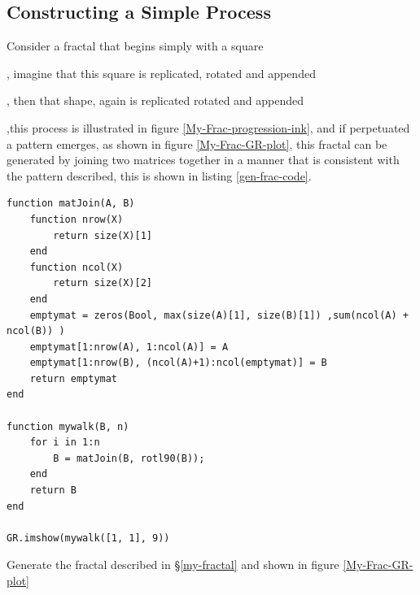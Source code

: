 \documentclass[a4paper,11pt,twoside]{article}
\begin{document}
\subsection{Constructing a Simple Process}
\label{sec:org4777473}

Consider a fractal that begins simply with a square
  ,
imagine that this square is replicated, rotated and appended
, then that shape, again is replicated rotated and appended
,this    process is illustrated in figure \ref{My-Frac-progression-ink}, and if perpetuated a pattern emerges, as shown in figure \ref{My-Frac-GR-plot}, this fractal can be generated by joining two matrices together in a manner that is consistent with the pattern described, this is shown in listing \ref{gen-frac-code}.

\begin{listing}[htbp]
\begin{verbatim}
function matJoin(A, B)
    function nrow(X)
        return size(X)[1]
    end
    function ncol(X)
        return size(X)[2]
    end
    emptymat = zeros(Bool, max(size(A)[1], size(B)[1]) ,sum(ncol(A) + ncol(B)) )
    emptymat[1:nrow(A), 1:ncol(A)] = A
    emptymat[1:nrow(B), (ncol(A)+1):ncol(emptymat)] = B
    return emptymat
end

function mywalk(B, n)
    for i in 1:n
        B = matJoin(B, rotl90(B));
    end
    return B
end

GR.imshow(mywalk([1, 1], 9))
\end{verbatim}
\caption{\label{gen-frac-code}Generate the fractal described in \S \ref{my-fractal} and shown in figure \ref{My-Frac-GR-plot}}
\end{listing}
\end{document}

